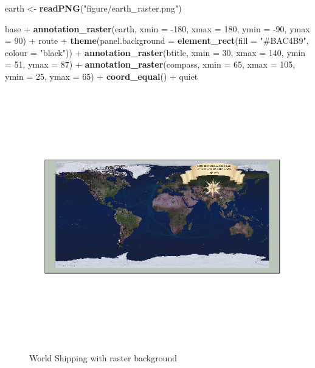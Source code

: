 \documentclass[]{article}
\newenvironment{Shaded}{}{}
\newcommand{\KeywordTok}[1]{\textcolor[rgb]{0.00,0.44,0.13}{\textbf{{#1}}}}
\newcommand{\DataTypeTok}[1]{\textcolor[rgb]{0.56,0.13,0.00}{{#1}}}
\newcommand{\DecValTok}[1]{\textcolor[rgb]{0.25,0.63,0.44}{{#1}}}
\newcommand{\StringTok}[1]{\textcolor[rgb]{0.25,0.44,0.63}{{#1}}}
\newcommand{\NormalTok}[1]{{#1}}
\begin{document}
\begin{Shaded}
\begin{Highlighting}[]
\NormalTok{earth <-}\StringTok{ }\KeywordTok{readPNG}\NormalTok{(}\StringTok{"figure/earth_raster.png"}\NormalTok{)}

\NormalTok{base +}\StringTok{ }\KeywordTok{annotation_raster}\NormalTok{(earth, }\DataTypeTok{xmin =} \NormalTok{-}\DecValTok{180}\NormalTok{, }\DataTypeTok{xmax =} \DecValTok{180}\NormalTok{, }\DataTypeTok{ymin =} \NormalTok{-}\DecValTok{90}\NormalTok{, }\DataTypeTok{ymax =} \DecValTok{90}\NormalTok{) +}\StringTok{ }
\StringTok{    }\NormalTok{route +}\StringTok{ }\KeywordTok{theme}\NormalTok{(}\DataTypeTok{panel.background =} \KeywordTok{element_rect}\NormalTok{(}\DataTypeTok{fill =} \StringTok{"#BAC4B9"}\NormalTok{, }\DataTypeTok{colour =} \StringTok{"black"}\NormalTok{)) +}\StringTok{ }
\StringTok{    }\KeywordTok{annotation_raster}\NormalTok{(btitle, }\DataTypeTok{xmin =} \DecValTok{30}\NormalTok{, }\DataTypeTok{xmax =} \DecValTok{140}\NormalTok{, }\DataTypeTok{ymin =} \DecValTok{51}\NormalTok{, }\DataTypeTok{ymax =} \DecValTok{87}\NormalTok{) +}\StringTok{ }
\StringTok{    }\KeywordTok{annotation_raster}\NormalTok{(compass, }\DataTypeTok{xmin =} \DecValTok{65}\NormalTok{, }\DataTypeTok{xmax =} \DecValTok{105}\NormalTok{, }\DataTypeTok{ymin =} \DecValTok{25}\NormalTok{, }\DataTypeTok{ymax =} \DecValTok{65}\NormalTok{) +}\StringTok{ }
\StringTok{    }\KeywordTok{coord_equal}\NormalTok{() +}\StringTok{ }\NormalTok{quiet}
\end{Highlighting}
\end{Shaded}

\begin{figure}[htbp]
\centering
\includegraphics{figure/World_Shipping_with_raster_background.png}
\caption{World Shipping with raster background}
\end{figure}
\end{document}
